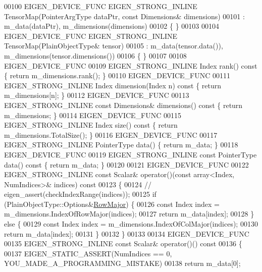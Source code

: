 \begin{DoxyCode}
00100     EIGEN\_DEVICE\_FUNC EIGEN\_STRONG\_INLINE TensorMap(PointerArgType dataPtr, \textcolor{keyword}{const} Dimensions& dimensions)
00101       : m\_data(dataPtr), m\_dimensions(dimensions)
00102     \{ \}
00103 
00104     EIGEN\_DEVICE\_FUNC EIGEN\_STRONG\_INLINE TensorMap(PlainObjectType& tensor)
00105       : m\_data(tensor.data()), m\_dimensions(tensor.dimensions())
00106     \{ \}
00107 
00108     EIGEN\_DEVICE\_FUNC
00109     EIGEN\_STRONG\_INLINE Index rank()\textcolor{keyword}{ const }\{ \textcolor{keywordflow}{return} m\_dimensions.rank(); \}
00110     EIGEN\_DEVICE\_FUNC
00111     EIGEN\_STRONG\_INLINE Index dimension(Index n)\textcolor{keyword}{ const }\{ \textcolor{keywordflow}{return} m\_dimensions[n]; \}
00112     EIGEN\_DEVICE\_FUNC
00113     EIGEN\_STRONG\_INLINE \textcolor{keyword}{const} Dimensions& dimensions()\textcolor{keyword}{ const }\{ \textcolor{keywordflow}{return} m\_dimensions; \}
00114     EIGEN\_DEVICE\_FUNC
00115     EIGEN\_STRONG\_INLINE Index size()\textcolor{keyword}{ const }\{ \textcolor{keywordflow}{return} m\_dimensions.TotalSize(); \}
00116     EIGEN\_DEVICE\_FUNC
00117     EIGEN\_STRONG\_INLINE PointerType data() \{ \textcolor{keywordflow}{return} m\_data; \}
00118     EIGEN\_DEVICE\_FUNC
00119     EIGEN\_STRONG\_INLINE \textcolor{keyword}{const} PointerType data()\textcolor{keyword}{ const }\{ \textcolor{keywordflow}{return} m\_data; \}
00120 
00121     EIGEN\_DEVICE\_FUNC
00122     EIGEN\_STRONG\_INLINE \textcolor{keyword}{const} Scalar& operator()(\textcolor{keyword}{const} array<Index, NumIndices>& indices)\textcolor{keyword}{ const}
00123 \textcolor{keyword}{    }\{
00124       \textcolor{comment}{//      eigen\_assert(checkIndexRange(indices));}
00125       \textcolor{keywordflow}{if} (PlainObjectType::Options&\hyperlink{group__enums_ggaacded1a18ae58b0f554751f6cdf9eb13acfcde9cd8677c5f7caf6bd603666aae3}{RowMajor}) \{
00126         \textcolor{keyword}{const} Index index = m\_dimensions.IndexOfRowMajor(indices);
00127         \textcolor{keywordflow}{return} m\_data[index];
00128       \} \textcolor{keywordflow}{else} \{
00129         \textcolor{keyword}{const} Index index = m\_dimensions.IndexOfColMajor(indices);
00130         \textcolor{keywordflow}{return} m\_data[index];
00131       \}
00132     \}
00133 
00134     EIGEN\_DEVICE\_FUNC
00135     EIGEN\_STRONG\_INLINE \textcolor{keyword}{const} Scalar& operator()()\textcolor{keyword}{ const}
00136 \textcolor{keyword}{    }\{
00137       EIGEN\_STATIC\_ASSERT(NumIndices == 0, YOU\_MADE\_A\_PROGRAMMING\_MISTAKE)
00138       \textcolor{keywordflow}{return} m\_data[0];

\end{DoxyCode}
